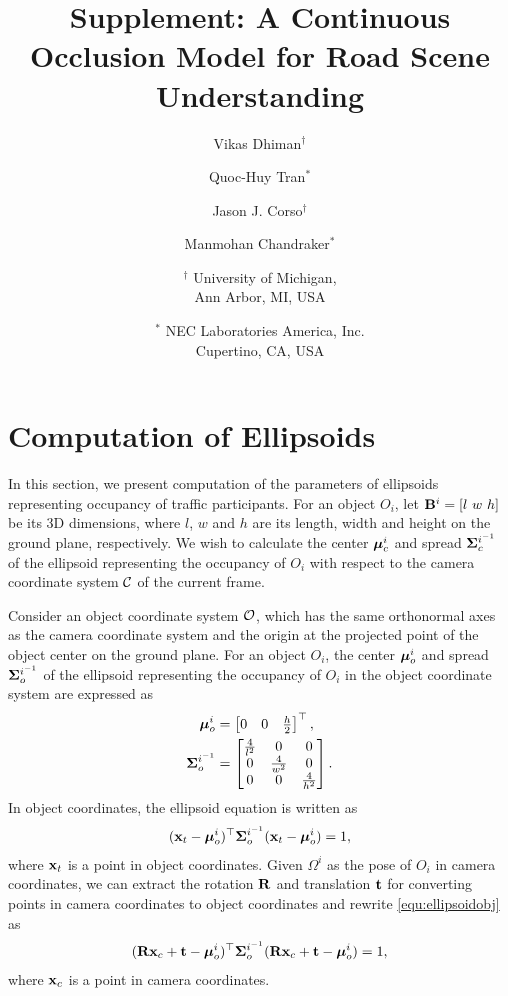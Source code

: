 \documentclass[10pt,twocolumn,letterpaper]{article}
\begin{document}
\title{Supplement: A Continuous Occlusion Model for Road Scene Understanding}

\author{Vikas Dhiman$^\dagger$
\and
Quoc-Huy Tran$^*$
\and
Jason J. Corso$^\dagger$
\and
Manmohan Chandraker$^*$
\and
$^\dagger$ University of Michigan,\\
Ann Arbor, MI, USA
\and
$^*$ NEC Laboratories America, Inc.\\
Cupertino, CA, USA
}

\maketitle

\appendix 

\section{Computation of Ellipsoids}
\label{sec:sigmacomputation}
In this section, we present computation of the parameters of ellipsoids representing occupancy of traffic participants. For an object $O_i$, let $\mathbf{B}^i = [l~w~h]$ be its 3D dimensions, where $l$, $w$ and $h$ are its length, width and height on the ground plane, respectively. We wish to calculate the center ${{\bm{\mu}}^{i}_c}$ and spread $\bm{\Sigma}^{i^{-1}}_c$ of the ellipsoid representing the occupancy of $O_i$ with respect to the camera coordinate system ${\mathcal{C}}$ of the current frame. 

Consider an object coordinate system ${\mathcal{O}}$, which has the same orthonormal axes as the camera coordinate system and the origin at the projected point of the object center on the ground plane. For an object $O_i$, the center ${\bm{\mu}}^{i}_o$ and spread $\bm{\Sigma}^{i^{-1}}_o$ of the ellipsoid representing the occupancy of $O_i$ in the object coordinate system are expressed as
\begin{align}
  {\bm{\mu}}^{i}_o &= \begin{bmatrix}
  0& 0& \frac{h}{2}
  \end{bmatrix}^\top,\\
  \bm{\Sigma}^{i^{-1}}_o &= \begin{bmatrix}
    \frac{4}{l^2} & 0 & 0 \\
    0 & \frac{4}{w^2} & 0 \\
    0 & 0 & \frac{4}{h^2}
  \end{bmatrix}.
\end{align}
In object coordinates, the ellipsoid equation is written as
\begin{align}
  (\mathbf{x}_t - {\bm{\mu}}^{i}_o)^\top \bm{\Sigma}^{i^{-1}}_o (\mathbf{x}_t - {\bm{\mu}}^{i}_o) = 1,
\label{equ:ellipsoidobj}
\end{align}
where $\mathbf{x}_t$ is a point in object coordinates. Given $\Omega^i$ as the pose of $O_i$ in camera coordinates, we can extract the rotation $\mathbf{R}$ and translation $\mathbf{t}$ for converting points in camera coordinates to object coordinates and rewrite \eqref{equ:ellipsoidobj} as
\begin{align}
  (\mathbf{R} \mathbf{x}_c + \mathbf{t} - {\bm{\mu}}^{i}_o)^\top \bm{\Sigma}^{i^{-1}}_o (\mathbf{R} \mathbf{x}_c + \mathbf{t} - {\bm{\mu}}^{i}_o) = 1,
\label{equ:ellipsoidobj1}
\end{align}
where $\mathbf{x}_c$ is a point in camera coordinates.
\end{document}

